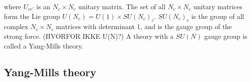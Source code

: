 where $U_{cc'}$ is an $N_c \times N_c$ unitary matrix.
The set of all $N_c\times N_c$ unitary matrices form the Lie group $U(N_c) = U(1)\times SU(N_c)_c$.
$SU(N_c)_c$ is the group of all complex $N_c\times N_c$ matrices with determinant 1, and is the gauge group of the strong force. (HVORFOR IKKE U(N)?)
A theory with a $SU(N)$ gauge group is called a Yang-Mills theory.



\subsection*{Yang-Mills theory}

